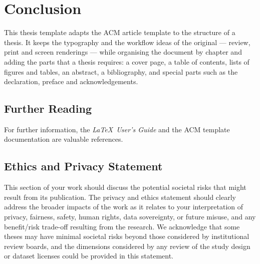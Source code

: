 \chapter{Conclusion}
\label{ch:conclusion}

This thesis template adapts the ACM article template to the structure of
a thesis. It keeps the typography and the workflow ideas of the original
--- review, print and screen renderings --- while organising the
document by chapter and adding the parts that a thesis requires: a cover
page, a table of contents, lists of figures and tables, an abstract, a
bibliography, and special parts such as the declaration, preface and
acknowledgements.

\section{Further Reading}
\label{sec:further-reading}

For further information, the {\itshape \LaTeX\ User's Guide} and the ACM
template documentation are valuable references.

\section{Ethics and Privacy Statement}
\label{sec:ethics}

This section of your work should discuss the potential societal risks
that might result from its publication. The privacy and ethics statement
should clearly address the broader impacts of the work as it relates to
your interpretation of privacy, fairness, safety, human rights, data
sovereignty, or future misuse, and any benefit/risk trade-off resulting
from the research. We acknowledge that some theses may have minimal
societal risks beyond those considered by institutional review boards,
and the dimensions considered by any review of the study design or
dataset licenses could be provided in this statement.
